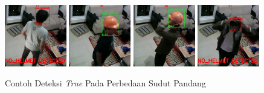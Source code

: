 \begin{figure} [h]
    \centering
    \includegraphics[width=0.24\textwidth]{gambar/analisis_gambar/contoh_betul/test1_cctv_pred (6).png}
    \includegraphics[width=0.24\textwidth]{gambar/analisis_gambar/contoh_betul/test2_cctv_pred (14).png}
    \includegraphics[width=0.24\textwidth]{gambar/analisis_gambar/contoh_betul/test3_cctv_pred (15).png}
    \includegraphics[width=0.24\textwidth]{gambar/analisis_gambar/contoh_betul/test3_cctv_pred (3).png}
    \caption{Contoh Deteksi \emph{True} Pada Perbedaan Sudut Pandang}
    \label{fig:example_true_direct}  
\end{figure}

